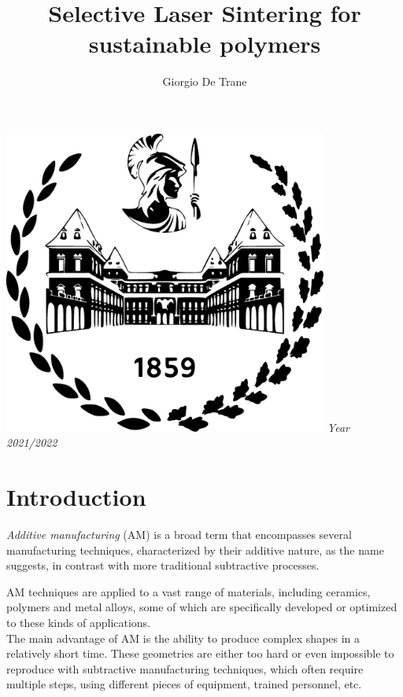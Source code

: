 \documentclass{article}
\author{Giorgio De Trane}
\title{\textbf{Selective Laser Sintering for sustainable polymers}}
\begin{document}
    \setlength{\parindent}{0pt}
    \maketitle
    \begin{center}
        \includegraphics[width=0.8\textwidth]{Pictures/polito_logo.eps}\linebreak\newline
        \textit{Year 2021/2022}
    \end{center}

    \newpage
    \tableofcontents
    \newpage
    \section{Introduction\label{Intro}}

    \textit{Additive manufacturing} (AM) is a broad term that encompasses several manufacturing techniques, characterized by their additive nature, as the name suggests, 
    in contrast with more traditional subtractive processes.
    
    AM techniques are applied to a vast range of materials, including ceramics, polymers and metal alloys, some of which are specifically developed or optimized to 
    these kinds of applications. \\ 
    
    The main advantage of AM is the ability to produce complex shapes in a relatively short time. 
    These geometries are either too hard or even impossible to reproduce with subtractive manufacturing techniques, which often require multiple steps, using different 
    pieces of equipment, trained personnel, etc. \\
\end{document}
